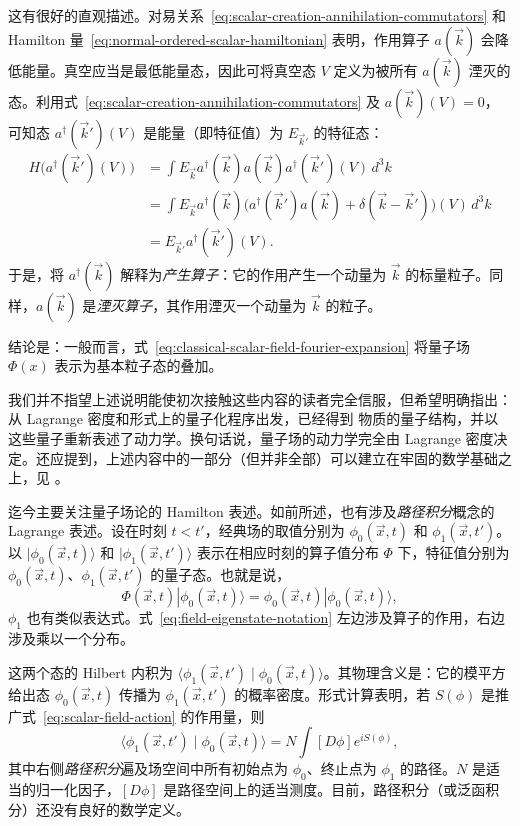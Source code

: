 这有很好的直观描述。对易关系~\eqref{eq:scalar-creation-annihilation-commutators} 和 Hamilton 量~\eqref{eq:normal-ordered-scalar-hamiltonian} 表明，作用算子 $a(\vec k)$ 会降低能量。真空应当是最低能量态，因此可将真空态 $V$ 定义为被所有 $a(\vec k)$ 湮灭的态。利用式~\eqref{eq:scalar-creation-annihilation-commutators} 及 $a(\vec k)(V)=0$，可知态 $a^\dagger(\vec k')(V)$ 是能量（即特征值）为 $E_{\vec k'}$ 的特征态：
\[
\begin{aligned}
H\bigl(a^\dagger(\vec k')(V)\bigr)
&=\int E_{\vec k}a^\dagger(\vec k)a(\vec k)a^\dagger(\vec k')(V)\,d^3k\\
&=\int E_{\vec k}a^\dagger(\vec k)
\bigl(a^\dagger(\vec k')a(\vec k)+\delta(\vec k-\vec k')\bigr)(V)\,d^3k\\
&=E_{\vec k'}a^\dagger(\vec k')(V).
\end{aligned}
\]
于是，将 $a^\dagger(\vec k)$ 解释为\emph{产生算子}：它的作用产生一个动量为 $\vec k$ 的标量粒子。同样，$a(\vec k)$ 是\emph{湮灭算子}，其作用湮灭一个动量为 $\vec k$ 的粒子。

结论是：一般而言，式~\eqref{eq:classical-scalar-field-fourier-expansion} 将量子场 $\Phi(x)$ 表示为基本粒子态的叠加。

我们并不指望上述说明能使初次接触这些内容的读者完全信服，但希望明确指出：从 Lagrange 密度和形式上的量子化程序出发，已经得到
物质的量子结构，并以这些量子重新表述了动力学。换句话说，量子场的动力学完全由 Lagrange 密度决定。还应提到，上述内容中的一部分（但并非全部）可以建立在牢固的数学基础之上，见 。

迄今主要关注量子场论的 Hamilton 表述。如前所述，也有涉及\emph{路径积分}概念的 Lagrange 表述。设在时刻 $t<t'$，经典场的取值分别为 $\phi_0(\vec x,t)$ 和 $\phi_1(\vec x,t')$。以 $|\phi_0(\vec x,t)\rangle$ 和 $|\phi_1(\vec x,t')\rangle$ 表示在相应时刻的算子值分布 $\Phi$ 下，特征值分别为 $\phi_0(\vec x,t)$、$\phi_1(\vec x,t')$ 的量子态。也就是说，
\begin{equation}\label{eq:field-eigenstate-notation}
\Phi(\vec x,t)|\phi_0(\vec x,t)\rangle
=\phi_0(\vec x,t)|\phi_0(\vec x,t)\rangle,
\end{equation}
$\phi_1$ 也有类似表达式。式~\eqref{eq:field-eigenstate-notation} 左边涉及算子的作用，右边涉及乘以一个分布。

这两个态的 Hilbert 内积为 $\langle\phi_1(\vec x,t')\mid\phi_0(\vec x,t)\rangle$。其物理含义是：它的模平方给出态 $\phi_0(\vec x,t)$ 传播为 $\phi_1(\vec x,t')$ 的概率密度。形式计算表明，若 $S(\phi)$ 是推广式~\eqref{eq:scalar-field-action} 的作用量，则
\[
\langle\phi_1(\vec x,t')\mid\phi_0(\vec x,t)\rangle
=N\int[D\phi]e^{iS(\phi)},
\]
其中右侧\emph{路径积分}遍及场空间中所有初始点为 $\phi_0$、终止点为 $\phi_1$ 的路径。$N$ 是适当的归一化因子，$[D\phi]$ 是路径空间上的适当测度。目前，路径积分（或泛函积分）还没有良好的数学定义。

